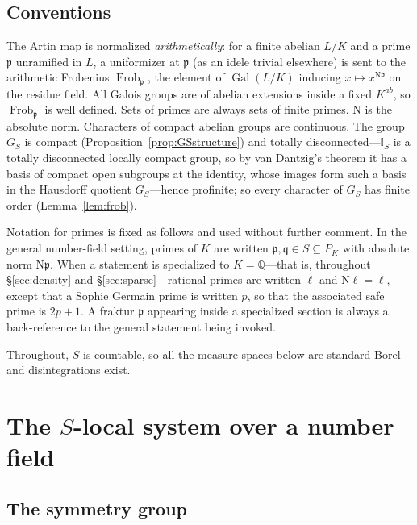 \documentclass[11pt]{amsart}
\numberwithin{equation}{section}
\theoremstyle{definition}
\theoremstyle{remark}
\newcommand{\Q}{\mathbb{Q}}
\newcommand{\Gal}{\operatorname{Gal}}
\newcommand{\Frob}{\operatorname{Frob}}
\newcommand{\Ns}{\mathrm{N}}
\newcommand{\Idl}{\mathbb{I}}
\newcommand{\pp}{\mathfrak{p}}
\newcommand{\qq}{\mathfrak{q}}
\begin{document}
\subsection*{Conventions}

The Artin map is normalized \emph{arithmetically}: for a finite abelian $L/K$
and a prime $\pp$ unramified in $L$, a uniformizer at $\pp$ (as an idele
trivial elsewhere) is sent to the arithmetic Frobenius $\Frob_\pp$, the
element of $\Gal(L/K)$ inducing $x\mapsto x^{\Ns\pp}$ on the residue field.
All Galois groups are of abelian extensions inside a fixed $K^{ab}$, so
$\Frob_\pp$ is well defined. Sets of primes are always sets of finite primes.
$\Ns$ is the absolute norm. Characters of compact abelian groups are
continuous. The group $G_S$ is compact (Proposition~\ref{prop:GSstructure}) and totally
disconnected---$\Idl_S$ is a totally disconnected locally compact group, so by van Dantzig's
theorem it has a basis of compact open subgroups at the identity, whose images form such a
basis in the Hausdorff quotient $G_S$---hence profinite; so every character of $G_S$ has
finite order (Lemma~\ref{lem:frob}).

Notation for primes is fixed as follows and used without further comment. In the general
number-field setting, primes of $K$ are written $\pp,\qq\in S\subseteq P_K$ with absolute
norm $\Ns\pp$. When a statement is specialized to $K=\Q$---that is, throughout
\S\ref{sec:density} and \S\ref{sec:sparse}---rational primes are written $\ell$ and
$\Ns\ell=\ell$, except that a Sophie Germain prime is written $p$, so that the associated
safe prime is $2p+1$. A fraktur $\pp$ appearing inside a specialized section is always a
back-reference to the general statement being invoked.

Throughout, $S$ is countable, so all the measure spaces below are standard
Borel and disintegrations exist.

\section{The $S$-local system over a number field}\label{sec:system}

\subsection{The symmetry group}
\end{document}
